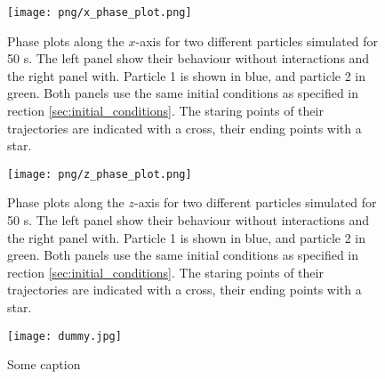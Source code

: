 \begin{figure}[h!]
    \texttt{[image: png/x\_phase\_plot.png]}
    \caption{Phase plots along the $x$-axis for two different particles simulated for 50 \textmu s. The left panel show their behaviour without interactions and the right panel with. Particle 1 is shown in blue, and particle 2 in green. Both panels use the same initial conditions as specified in rection \ref{sec:initial_conditions}. The staring points of their trajectories are indicated with a cross, their ending points with a star.}
    \label{fig:x_phase_two_particles}
\end{figure}

\begin{figure}[h!]
    \texttt{[image: png/z\_phase\_plot.png]}
    \caption{Phase plots along the $z$-axis for two different particles simulated for 50 \textmu s. The left panel show their behaviour without interactions and the right panel with. Particle 1 is shown in blue, and particle 2 in green. Both panels use the same initial conditions as specified in rection \ref{sec:initial_conditions}. The staring points of their trajectories are indicated with a cross, their ending points with a star.}
    \label{fig:z_phase_two_particles}
\end{figure}

\begin{figure}[h!]
    \texttt{[image: dummy.jpg]}
    \caption{Some caption}
    \label{fig:some_ref} 
\end{figure}




\twocolumngrid
 





